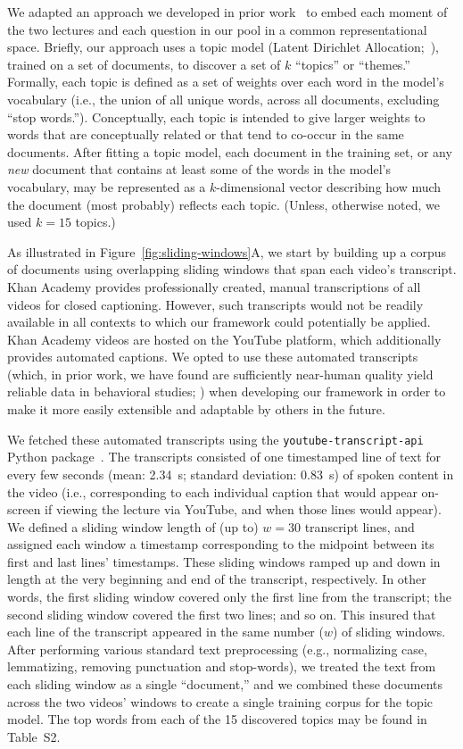 \documentclass[10pt]{article}
\newcommand{\topics}{S2}
\begin{document}
We adapted an approach we developed in prior work~\citep{HeusEtal21} to embed
each moment of the two lectures and each question in our pool in a common
representational space. Briefly, our approach uses a topic model (Latent
Dirichlet Allocation;~\citealp{BleiEtal03}), trained on a set of documents, to
discover a set of $k$ ``topics'' or ``themes.'' Formally, each topic is defined
as a set of weights over each word in the model's vocabulary (i.e., the union
of all unique words, across all documents, excluding ``stop words.'').
Conceptually, each topic is intended to give larger weights to words that are
conceptually related or that tend to co-occur in the same documents. After
fitting a topic model, each document in the training set, or any \textit{new}
document that contains at least some of the words in the model's vocabulary,
may be represented as a $k$-dimensional vector describing how much the document
(most probably) reflects each topic. (Unless, otherwise noted, we used $k = 15$
topics.)

As illustrated in Figure~\ref{fig:sliding-windows}A, we start by building up a
corpus of documents using overlapping sliding windows that span each video's
transcript. Khan Academy provides professionally created, manual 
transcriptions of all videos for closed captioning. However, such transcripts 
would not be readily available in all contexts to which our framework could 
potentially be applied. Khan Academy videos are hosted on the YouTube 
platform, which additionally provides automated captions. We opted to use 
these automated transcripts (which, in prior work, we have found are 
sufficiently near-human quality yield reliable data in behavioral studies; 
\citealp{ZimaEtal18}) when developing our framework in order to make it 
more easily extensible and adaptable by others in the future.

We fetched these automated transcripts using the
\texttt{youtube-transcript-api} Python package~\citep{Depo19}. The transcripts
consisted of one timestamped line of text for every few seconds (mean: 2.34~s;
standard deviation: 0.83~s) of spoken content in the video (i.e., corresponding
to each individual caption that would appear on-screen if viewing the lecture
via YouTube, and when those lines would appear). We defined a sliding window
length of (up to) $w = 30$ transcript lines, and assigned each window a
timestamp corresponding to the midpoint between its first and last lines'
timestamps. These sliding windows ramped up and down in length at the very
beginning and end of the transcript, respectively. In other words, the first
sliding window covered only the first line from the transcript; the second
sliding window covered the first two lines; and so on. This insured that each
line of the transcript appeared in the same number ($w$) of sliding windows.
After performing various standard text preprocessing (e.g., normalizing case,
lemmatizing, removing punctuation and stop-words), we treated the text from
each sliding window as a single ``document,'' and we combined these documents
across the two videos' windows to create a single training corpus for the topic
model. The top words from each of the 15 discovered topics may be found in
Table~\topics.
\end{document}
